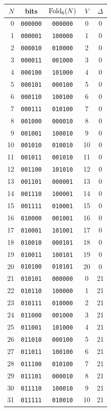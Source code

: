 \begin{tabular}{rcccc}%
\hline%
\textbf{$N$}&\textbf{bits}&\textbf{$\mathrm{Fold}_6(N)$}&\textbf{$V$}&\textbf{$\Delta$}\\%
\hline%
0&\texttt{000000}&\texttt{000000}&0&0\\%
1&\texttt{000001}&\texttt{100000}&1&0\\%
2&\texttt{000010}&\texttt{010000}&2&0\\%
3&\texttt{000011}&\texttt{001000}&3&0\\%
4&\texttt{000100}&\texttt{101000}&4&0\\%
5&\texttt{000101}&\texttt{000100}&5&0\\%
6&\texttt{000110}&\texttt{100100}&6&0\\%
7&\texttt{000111}&\texttt{010100}&7&0\\%
8&\texttt{001000}&\texttt{000010}&8&0\\%
9&\texttt{001001}&\texttt{100010}&9&0\\%
10&\texttt{001010}&\texttt{010010}&10&0\\%
11&\texttt{001011}&\texttt{001010}&11&0\\%
12&\texttt{001100}&\texttt{101010}&12&0\\%
13&\texttt{001101}&\texttt{000001}&13&0\\%
14&\texttt{001110}&\texttt{100001}&14&0\\%
15&\texttt{001111}&\texttt{010001}&15&0\\%
16&\texttt{010000}&\texttt{001001}&16&0\\%
17&\texttt{010001}&\texttt{101001}&17&0\\%
18&\texttt{010010}&\texttt{000101}&18&0\\%
19&\texttt{010011}&\texttt{100101}&19&0\\%
20&\texttt{010100}&\texttt{010101}&20&0\\%
21&\texttt{010101}&\texttt{000000}&0&21\\%
22&\texttt{010110}&\texttt{100000}&1&21\\%
23&\texttt{010111}&\texttt{010000}&2&21\\%
24&\texttt{011000}&\texttt{001000}&3&21\\%
25&\texttt{011001}&\texttt{101000}&4&21\\%
26&\texttt{011010}&\texttt{000100}&5&21\\%
27&\texttt{011011}&\texttt{100100}&6&21\\%
28&\texttt{011100}&\texttt{010100}&7&21\\%
29&\texttt{011101}&\texttt{000010}&8&21\\%
30&\texttt{011110}&\texttt{100010}&9&21\\%
31&\texttt{011111}&\texttt{010010}&10&21\\%
\hline%
\end{tabular}
